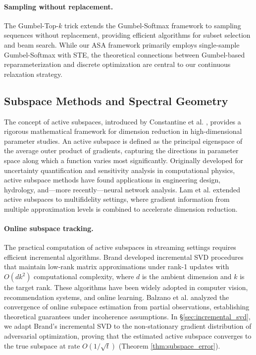 \documentclass[preprint,12pt]{elsarticle}
\begin{document}
\paragraph{Sampling without replacement.} The Gumbel-Top-$k$ trick \cite{kool2019stochastic} extends the Gumbel-Softmax framework to sampling sequences without replacement, providing efficient algorithms for subset selection and beam search. While our ASA framework primarily employs single-sample Gumbel-Softmax with STE, the theoretical connections between Gumbel-based reparameterization and discrete optimization are central to our continuous relaxation strategy.

\subsection{Subspace Methods and Spectral Geometry}
\label{sec:rw_subspace}

The concept of active subspaces, introduced by Constantine et al. \cite{constantine2014active, constantine2015active}, provides a rigorous mathematical framework for dimension reduction in high-dimensional parameter studies. An active subspace is defined as the principal eigenspace of the average outer product of gradients, capturing the directions in parameter space along which a function varies most significantly. Originally developed for uncertainty quantification and sensitivity analysis in computational physics, active subspace methods have found applications in engineering design, hydrology, and---more recently---neural network analysis. Lam et al. \cite{lam2022multifidelity} extended active subspaces to multifidelity settings, where gradient information from multiple approximation levels is combined to accelerate dimension reduction.

\paragraph{Online subspace tracking.} The practical computation of active subspaces in streaming settings requires efficient incremental algorithms. Brand \cite{brand2002incremental, brand2006fast} developed incremental SVD procedures that maintain low-rank matrix approximations under rank-1 updates with $O(dk^2)$ computational complexity, where $d$ is the ambient dimension and $k$ is the target rank. These algorithms have been widely adopted in computer vision, recommendation systems, and online learning. Balzano et al. \cite{balzano2018online} analyzed the convergence of online subspace estimation from partial observations, establishing theoretical guarantees under incoherence assumptions. In \S\ref{sec:incremental_svd}, we adapt Brand's incremental SVD to the non-stationary gradient distribution of adversarial optimization, proving that the estimated active subspace converges to the true subspace at rate $O(1/\sqrt{t})$ (Theorem \ref{thm:subspace_error}).
\end{document}

